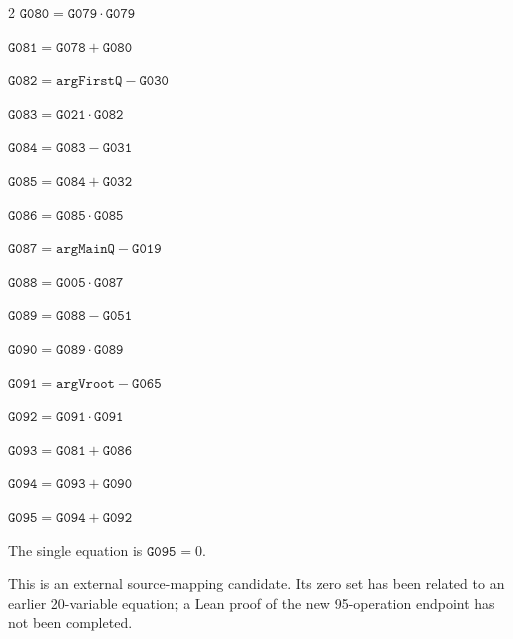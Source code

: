 \documentclass[10pt]{article}
\begin{document}
\begin{multicols}{2}
\noindent $\mathtt{G080}=\mathtt{G079}\cdot \mathtt{G079}$\par
\noindent $\mathtt{G081}=\mathtt{G078}+\mathtt{G080}$\par
\noindent $\mathtt{G082}=\mathtt{argFirstQ}-\mathtt{G030}$\par
\noindent $\mathtt{G083}=\mathtt{G021}\cdot \mathtt{G082}$\par
\noindent $\mathtt{G084}=\mathtt{G083}-\mathtt{G031}$\par
\noindent $\mathtt{G085}=\mathtt{G084}+\mathtt{G032}$\par
\noindent $\mathtt{G086}=\mathtt{G085}\cdot \mathtt{G085}$\par
\noindent $\mathtt{G087}=\mathtt{argMainQ}-\mathtt{G019}$\par
\noindent $\mathtt{G088}=\mathtt{G005}\cdot \mathtt{G087}$\par
\noindent $\mathtt{G089}=\mathtt{G088}-\mathtt{G051}$\par
\noindent $\mathtt{G090}=\mathtt{G089}\cdot \mathtt{G089}$\par
\noindent $\mathtt{G091}=\mathtt{argVroot}-\mathtt{G065}$\par
\noindent $\mathtt{G092}=\mathtt{G091}\cdot \mathtt{G091}$\par
\noindent $\mathtt{G093}=\mathtt{G081}+\mathtt{G086}$\par
\noindent $\mathtt{G094}=\mathtt{G093}+\mathtt{G090}$\par
\noindent $\mathtt{G095}=\mathtt{G094}+\mathtt{G092}$\par
\end{multicols}
\noindent The single equation is $\boxed{\mathtt{G095}=0}$.
\par\medskip
This is an external source-mapping candidate. Its zero set has been related to
an earlier 20-variable equation; a Lean proof of the new 95-operation endpoint
has not been completed.
\bigskip
\end{document}
